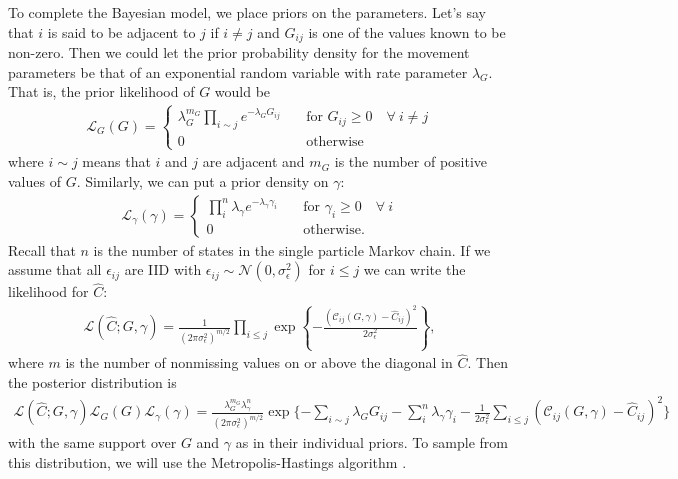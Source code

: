 \documentclass{article}
\begin{document}
To complete the Bayesian model,
we place priors on the parameters.
Let's say that $i$ is said to be adjacent to $j$ if $i \neq j$ and $G_{ij}$ is one of 
the values known to be non-zero.
Then we could let the prior probability density for the movement parameters be that of an 
exponential random variable with rate parameter $\lambda_{G}$. 
That is, the prior likelihood of $G$ would be
\begin{align*}
\mathcal{L}_G(G) = 
\begin{cases}
	\lambda_{G}^{m_G} \prod_{i \sim j} e^{-\lambda_{G} G_{ij}} 
		\quad & \text{for $G_{ij} \geq 0 \quad \forall \ i \neq j$} \\
	0 & \text{otherwise}
\end{cases}
\end{align*}
where $i \sim j$ means that $i$ and $j$ are adjacent and $m_G$ is the number of positive values of $G$. 
Similarly, we can put a prior density on $\gamma$:
\begin{align*}
\mathcal{L}_{\gamma}(\gamma) = 
\begin{cases}
	\prod_{i}^{n} \lambda_{\gamma} e^{-\lambda_{\gamma}\gamma_i} 
		\quad & \text{for $\gamma_i \geq 0 \quad \forall \ i$} \\
	0 & \text{otherwise.}
\end{cases}
\end{align*}
Recall that $n$ is the number of states in the single particle Markov chain.
If we assume that all $\epsilon_{ij}$ are IID with $\epsilon_{ij} \sim \mathcal{N}(0,\sigma_{\epsilon}^2)$ 
for $i \leq j$
we can write the likelihood for $\hat{C}$:
\begin{align*}
\mathcal{L}(\hat{C};G,\gamma) = \frac{1}{(2 \pi \sigma_{\epsilon}^2)^{m/2}} \prod_{i \leq j}
	\exp\left\{-\frac{(\mathcal{C}_{ij}(G,\gamma) - \hat{C}_{ij})^2}{2 \sigma_{\epsilon}^2}\right\},
\end{align*}
where $m$ is the number of nonmissing values on or above the diagonal in $\hat{C}$.
Then the posterior distribution is
\begin{align} \label{eq:post}
\mathcal{L}(\hat{C};G,\gamma) \mathcal{L}_{G}(G) \mathcal{L}_{\gamma}(\gamma) = 
	\frac{\lambda_{G}^{m_G} \lambda_{\gamma}^n}{(2 \pi \sigma_{\epsilon}^2)^{m/2}}
	\exp\{-\sum_{i \sim j} \lambda_G G_{ij} -\sum_{i}^n \lambda_{\gamma}\gamma_i
		-\frac{1}{2 \sigma_{\epsilon}^2} \sum_{i \leq j} (\mathcal{C}_{ij}
		(G,\gamma) - \hat{C}_{ij})^2 \}
\end{align}
with the same support over $G$ and $\gamma$ as in their individual priors.
To sample from this distribution, 
we will use the Metropolis-Hastings algorithm \citep{brooks2011handbook}. 
\end{document}
